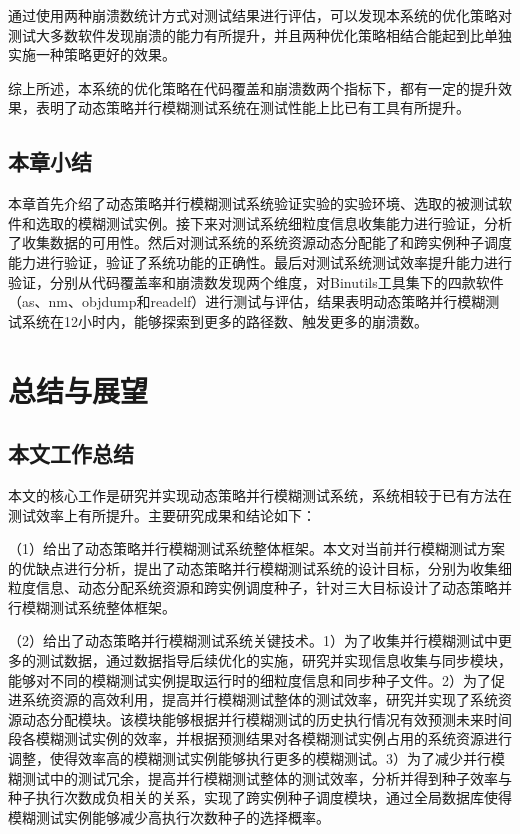 \documentclass[master]{thesis-uestc}
\begin{document}
通过使用两种崩溃数统计方式对测试结果进行评估，可以发现本系统的优化策略对测试大多数软件发现崩溃的能力有所提升，并且两种优化策略相结合能起到比单独实施一种策略更好的效果。

综上所述，本系统的优化策略在代码覆盖和崩溃数两个指标下，都有一定的提升效果，表明了动态策略并行模糊测试系统在测试性能上比已有工具有所提升。

\section{本章小结}

本章首先介绍了动态策略并行模糊测试系统验证实验的实验环境、选取的被测试软件和选取的模糊测试实例。接下来对测试系统细粒度信息收集能力进行验证，分析了收集数据的可用性。然后对测试系统的系统资源动态分配能了和跨实例种子调度能力进行验证，验证了系统功能的正确性。最后对测试系统测试效率提升能力进行验证，分别从代码覆盖率和崩溃数发现两个维度，对Binutils工具集下的四款软件（as、nm、objdump和readelf）进行测试与评估，结果表明动态策略并行模糊测试系统在12小时内，能够探索到更多的路径数、触发更多的崩溃数。 

\chapter{总结与展望}

\section{本文工作总结}

本文的核心工作是研究并实现动态策略并行模糊测试系统，系统相较于已有方法在测试效率上有所提升。主要研究成果和结论如下：

（1）给出了动态策略并行模糊测试系统整体框架。本文对当前并行模糊测试方案的优缺点进行分析，提出了动态策略并行模糊测试系统的设计目标，分别为收集细粒度信息、动态分配系统资源和跨实例调度种子，针对三大目标设计了动态策略并行模糊测试系统整体框架。

（2）给出了动态策略并行模糊测试系统关键技术。1）为了收集并行模糊测试中更多的测试数据，通过数据指导后续优化的实施，研究并实现信息收集与同步模块，能够对不同的模糊测试实例提取运行时的细粒度信息和同步种子文件。2）为了促进系统资源的高效利用，提高并行模糊测试整体的测试效率，研究并实现了系统资源动态分配模块。该模块能够根据并行模糊测试的历史执行情况有效预测未来时间段各模糊测试实例的效率，并根据预测结果对各模糊测试实例占用的系统资源进行调整，使得效率高的模糊测试实例能够执行更多的模糊测试。3）为了减少并行模糊测试中的测试冗余，提高并行模糊测试整体的测试效率，分析并得到种子效率与种子执行次数成负相关的关系，实现了跨实例种子调度模块，通过全局数据库使得模糊测试实例能够减少高执行次数种子的选择概率。
\end{document}
